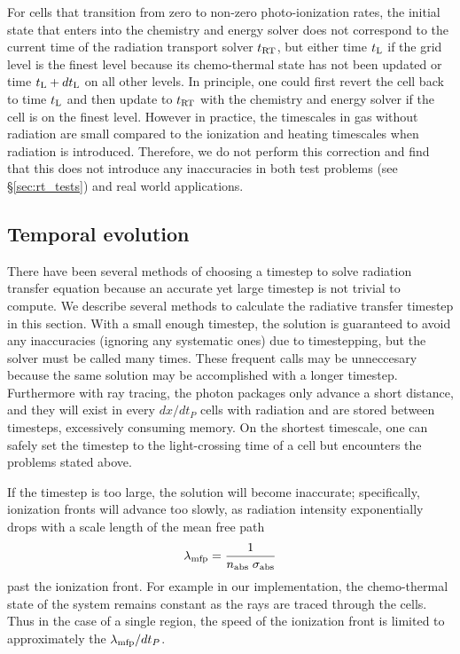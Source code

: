 \documentclass[12pt,preprint]{aastex}
\begin{document}
For cells that transition from zero to non-zero photo-ionization
rates, the initial state that enters into the chemistry and energy
solver does not correspond to the current time of the radiation
transport solver $t_{\rm RT}$, but either time $t_{\rm L}$ if the grid
level is the finest level because its chemo-thermal state has not been
updated or time $t_{\rm L}+dt_{\rm L}$ on all other levels.  In
principle, one could first revert the cell back to time $t_{\rm L}$
and then update to $t_{\rm RT}$ with the chemistry and energy solver
if the cell is on the finest level.  However in practice, the
timescales in gas without radiation are small compared to the
ionization and heating timescales when radiation is introduced.
Therefore, we do not perform this correction and find that this does
not introduce any inaccuracies in both test problems (see
\S\ref{sec:rt_tests}) and real world applications.


\subsection{Temporal evolution}
\label{sec:timestepping}

There have been several methods of choosing a timestep to solve
radiation transfer equation because an accurate yet large timestep is
not trivial to compute.  We describe several methods to calculate the
radiative transfer timestep in this section.  With a small enough
timestep, the solution is guaranteed to avoid any inaccuracies
(ignoring any systematic ones) due to timestepping, but the solver
must be called many times.  These frequent calls may be unneccesary
because the same solution may be accomplished with a longer timestep.
Furthermore with ray tracing, the photon packages only advance a short
distance, and they will exist in every $dx/dt_P$ cells with radiation
and are stored between timesteps, excessively consuming memory.  On
the shortest timescale, one can safely set the timestep to the
light-crossing time of a cell \citep{Abel99_RT, Trac07} but encounters
the problems stated above.

If the timestep is too large, the solution will become inaccurate;
specifically, ionization fronts will advance too slowly, as radiation
intensity exponentially drops with a scale length of the mean free
path
\begin{equation}
  \label{eqn:mfp}
  \lambda_{\rm mfp} = \frac{1}{n_{\rm abs} \; \sigma_{\rm abs}}
\end{equation}
past the ionization front.  For example in our implementation, the
chemo-thermal state of the system remains constant as the rays are
traced through the cells.  Thus in the case of a single 
region, the speed of the ionization front is limited to approximately
the $\lambda_{\rm mfp} / dt_P$.
\end{document}
